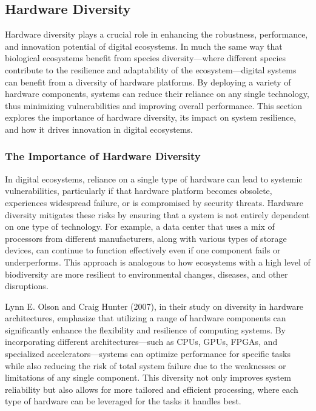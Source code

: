 \documentclass[12pt,twoside]{article}
\begin{document}
\subsection{Hardware Diversity}

Hardware diversity plays a crucial role in enhancing the robustness, performance, and innovation potential of digital ecosystems. In much the same way that biological ecosystems benefit from species diversity—where different species contribute to the resilience and adaptability of the ecosystem—digital systems can benefit from a diversity of hardware platforms. By deploying a variety of hardware components, systems can reduce their reliance on any single technology, thus minimizing vulnerabilities and improving overall performance. This section explores the importance of hardware diversity, its impact on system resilience, and how it drives innovation in digital ecosystems.

\subsubsection{The Importance of Hardware Diversity}

In digital ecosystems, reliance on a single type of hardware can lead to systemic vulnerabilities, particularly if that hardware platform becomes obsolete, experiences widespread failure, or is compromised by security threats. Hardware diversity mitigates these risks by ensuring that a system is not entirely dependent on one type of technology. For example, a data center that uses a mix of processors from different manufacturers, along with various types of storage devices, can continue to function effectively even if one component fails or underperforms. This approach is analogous to how ecosystems with a high level of biodiversity are more resilient to environmental changes, diseases, and other disruptions.

Lynn E. Olson and Craig Hunter (2007), in their study on diversity in hardware architectures, emphasize that utilizing a range of hardware components can significantly enhance the flexibility and resilience of computing systems. By incorporating different architectures—such as CPUs, GPUs, FPGAs, and specialized accelerators—systems can optimize performance for specific tasks while also reducing the risk of total system failure due to the weaknesses or limitations of any single component. This diversity not only improves system reliability but also allows for more tailored and efficient processing, where each type of hardware can be leveraged for the tasks it handles best.
\end{document}
